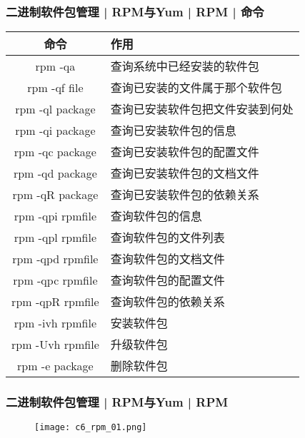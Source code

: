 \begin{frame}
  \frametitle{二进制软件包管理 | RPM与Yum | RPM | \alert{命令}}
  \begin{table}
    \centering
    \begin{tabularx}{\textwidth}{cX}
      \hline
      \rowcolor{blue!50}命令 & 作用\\
      \hline
      rpm -qa & 查询系统中已经安装的软件包\\
      rpm -qf file & 查询已安装的文件属于那个软件包\\
      rpm -ql package & 查询已安装软件包把文件安装到何处\\
      rpm -qi package & 查询已安装软件包的信息\\
      rpm -qc package & 查询已安装软件包的配置文件\\
      rpm -qd package & 查询已安装软件包的文档文件\\
      rpm -qR package & 查询已安装软件包的依赖关系\\
      \hline
      rpm -qpi rpmfile & 查询软件包的信息\\
      rpm -qpl rpmfile & 查询软件包的文件列表\\
      rpm -qpd rpmfile & 查询软件包的文档文件\\
      rpm -qpc rpmfile & 查询软件包的配置文件\\
      rpm -qpR rpmfile & 查询软件包的依赖关系\\
      \hline
      rpm -ivh rpmfile & 安装软件包\\
      rpm -Uvh rpmfile & 升级软件包\\
      rpm -e package & 删除软件包\\
      \hline
    \end{tabularx}
  \end{table}
\end{frame}

\begin{frame}
  \frametitle{二进制软件包管理 | RPM与Yum | RPM}
  \begin{figure}
    \centering
    \texttt{[image: c6\_rpm\_01.png]}
  \end{figure}
\end{frame}

